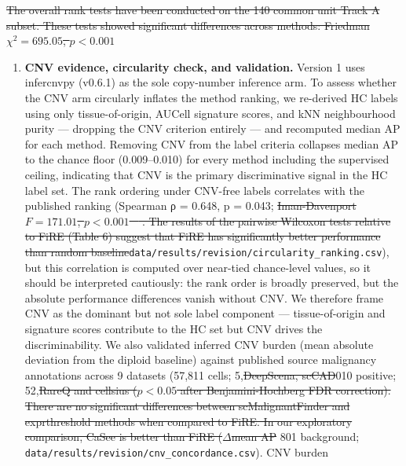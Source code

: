 \documentclass[10pt]{article}
\providecommand{\DIFaddtex}[1]{{\protect\color{trackgreen}#1}} %
\providecommand{\DIFdeltex}[1]{{\protect\color{red}\sout{#1}}}                      %
\providecommand{\DIFaddbegin}{} %
\providecommand{\DIFaddend}{} %
\providecommand{\DIFdelbegin}{} %
\providecommand{\DIFdelend}{} %
\providecommand{\DIFadd}[1]{\texorpdfstring{\DIFaddtex{#1}}{#1}} %
\providecommand{\DIFdel}[1]{\texorpdfstring{\DIFdeltex{#1}}{}} %
\newcommand{\DIFscaledelfig}{0.5}
\newlength{\DIFdelgraphicswidth} %
\newlength{\DIFdelgraphicsheight} %
\newcommand{\DIFaddincludegraphics}[2][]{{\color{trackgreen}\fbox{\DIFOincludegraphics[#1]{#2}}}} %
\newcommand{\DIFdelincludegraphics}[2][]{%
\sbox{\DIFdelgraphicsbox}{\DIFOincludegraphics[#1]{#2}}%
\settoboxwidth{\DIFdelgraphicswidth}{\DIFdelgraphicsbox} %
\settoboxtotalheight{\DIFdelgraphicsheight}{\DIFdelgraphicsbox} %
\scalebox{\DIFscaledelfig}{%
\parbox[b]{\DIFdelgraphicswidth}{\usebox{\DIFdelgraphicsbox}\\[-\baselineskip] \rule{\DIFdelgraphicswidth}{0em}}\llap{\resizebox{\DIFdelgraphicswidth}{\DIFdelgraphicsheight}{%
\setlength{\unitlength}{\DIFdelgraphicswidth}%
\begin{picture}(1,1)%
\thicklines\linethickness{2pt} %
{\color[rgb]{1,0,0}\put(0,0){\framebox(1,1){}}}%
{\color[rgb]{1,0,0}\put(0,0){\line( 1,1){1}}}%
{\color[rgb]{1,0,0}\put(0,1){\line(1,-1){1}}}%
\end{picture}%
}\hspace*{3pt}}} %
} %
\DeclareRobustCommand{\DIFaddbegin}{\DIFOaddbegin \let\includegraphics\DIFaddincludegraphics} %
\DeclareRobustCommand{\DIFaddend}{\DIFOaddend \let\includegraphics\DIFOincludegraphics} %
\DeclareRobustCommand{\DIFdelbegin}{\DIFOdelbegin \let\includegraphics\DIFdelincludegraphics} %
\DeclareRobustCommand{\DIFdelend}{\DIFOaddend \let\includegraphics\DIFOincludegraphics} %
\providecommand{\tightlist}{\setlength{\itemsep}{0pt}\setlength{\parskip}{0pt}}
\begin{document}
\DIFdelbegin \DIFdel{The overall rank tests have been conducted on the 140 common unit Track A subset. These tests showed significant differences across methods: Friedman $\chi^2 = 695.05$, $p < 0.001$}\DIFdelend \DIFaddbegin \begin{enumerate}
\def\labelenumi{\arabic{enumi}.}
\tightlist
\item
  \textbf{\DIFadd{CNV evidence, circularity check, and validation.}} \DIFadd{Version 1
  uses infercnvpy (v0.6.1) as the sole copy-number inference arm. To
  assess whether the CNV arm circularly inflates the method ranking, we
  re-derived HC labels using only tissue-of-origin, AUCell signature
  scores, and kNN neighbourhood purity --- dropping the CNV criterion
  entirely --- and recomputed median AP for each method. Removing CNV
  from the label criteria collapses median AP to the chance floor
  (0.009--0.010) for every method including the supervised ceiling,
  indicating that CNV is the primary discriminative signal in the HC
  label set. The rank ordering under CNV-free labels correlates with the
  published ranking (Spearman ρ = 0.648, p = 0.043}\DIFaddend ;
  \DIFdelbegin \DIFdel{Iman-Davenport $F = 171.01$, $p < 0.001$ \mbox{%
\cite{davis2006relationship,saito2015precision}}\hskip0pt%
. The results of the pairwise Wilcoxon tests relative to FiRE (Table 6)
suggest that FiRE has significantly better performance than random baseline}\DIFdelend \DIFaddbegin \texttt{\DIFadd{data/results/revision/circularity\_ranking.csv}}\DIFadd{), but this
  correlation is computed over near-tied chance-level values, so it
  should be interpreted cautiously: the rank order is broadly preserved,
  but the absolute performance differences vanish without CNV. We
  therefore frame CNV as the dominant but not sole label component ---
  tissue-of-origin and signature scores contribute to the HC set but CNV
  drives the discriminability. We also validated inferred CNV burden
  (mean absolute deviation from the diploid baseline) against published
  source malignancy annotations across 9 datasets (57,811 cells; 5}\DIFaddend ,\DIFdelbegin \DIFdel{DeepScena, scCAD}\DIFdelend \DIFaddbegin \DIFadd{010
  positive; 52}\DIFaddend ,\DIFdelbegin \DIFdel{RareQ and cellsius ($p < 0.05$ after Benjamini-Hochberg FDR correction).
  There are no significant differences between scMalignantFinder and exprthreshold methods when compared to FiRE. In our exploratory comparison, CaSee is better than FiRE ($\Delta$mean AP }\DIFdelend \DIFaddbegin \DIFadd{801 background;
  }\texttt{\DIFadd{data/results/revision/cnv\_concordance.csv}}\DIFadd{). CNV burden
}
\end{enumerate}
\end{document}
